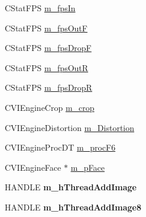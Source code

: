 \begin{DoxyCompactItemize}
C\+Stat\+F\+P\+S \hyperlink{class_c_v_i_engine_base_a3f8d2ef96946316d4b11b4eef209cd35}{m\+\_\+fps\+In}
\item 
C\+Stat\+F\+P\+S \hyperlink{class_c_v_i_engine_base_a68263a05d2dcb87863aac27632c6fefa}{m\+\_\+fps\+Out\+F}
\item 
C\+Stat\+F\+P\+S \hyperlink{class_c_v_i_engine_base_afe15eeaa45219bf0b4c4ffbf08887d4a}{m\+\_\+fps\+Drop\+F}
\item 
C\+Stat\+F\+P\+S \hyperlink{class_c_v_i_engine_base_a2ad39d8c6557ef3c0dd6fb9dc376c8b5}{m\+\_\+fps\+Out\+R}
\item 
C\+Stat\+F\+P\+S \hyperlink{class_c_v_i_engine_base_a3bd5b977e29332c55f1eaf9a1192d03a}{m\+\_\+fps\+Drop\+R}
\item 
C\+V\+I\+Engine\+Crop \hyperlink{class_c_v_i_engine_base_a914dcdad5bb4fa5d7c0363122aa5fa0b}{m\+\_\+crop}
\item 
C\+V\+I\+Engine\+Distortion \hyperlink{class_c_v_i_engine_base_a5f19c0757146848a5e16bbe1a2a8d6f9}{m\+\_\+\+Distortion}
\item 
C\+V\+I\+Engine\+Proc\+D\+T \hyperlink{class_c_v_i_engine_base_af130df6a0fc2f75aeea417af333755a2}{m\+\_\+proc\+F6}
\item 
C\+V\+I\+Engine\+Face $\ast$ \hyperlink{class_c_v_i_engine_base_a67ce30a4c5018bdb7d33725094454166}{m\+\_\+p\+Face}
\item 
\hypertarget{class_c_v_i_engine_base_a4d289b3028ab2b3c1a91bf08de42144e}{H\+A\+N\+D\+L\+E {\bfseries m\+\_\+h\+Thread\+Add\+Image}}\label{class_c_v_i_engine_base_a4d289b3028ab2b3c1a91bf08de42144e}

\item 
\hypertarget{class_c_v_i_engine_base_a81b0c7b485feb8404fa06b2e91300d14}{H\+A\+N\+D\+L\+E {\bfseries m\+\_\+h\+Thread\+Add\+Image8}}\label{class_c_v_i_engine_base_a81b0c7b485feb8404fa06b2e91300d14}

\end{DoxyCompactItemize}


